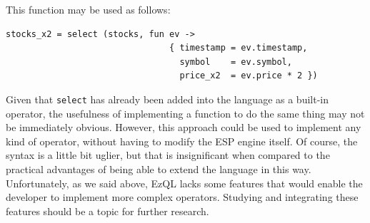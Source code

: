 This function may be used as follows:

\begin{lstlisting}
stocks_x2 = select (stocks, fun ev ->
                                { timestamp = ev.timestamp,
                                  symbol    = ev.symbol,
                                  price_x2  = ev.price * 2 })
\end{lstlisting}

Given that \verb=select= has already been added into the language as a
built-in operator, the usefulness of implementing a function to do the
same thing may not be immediately obvious. However, this approach
could be used to implement any kind of operator, without having to
modify the ESP engine itself. Of course, the syntax is a little bit
uglier, but that is insignificant when compared to the practical
advantages of being able to extend the language in this
way. Unfortunately, as we said above, EzQL lacks some features that
would enable the developer to implement more complex
operators. Studying and integrating these features should be a topic
for further research.

